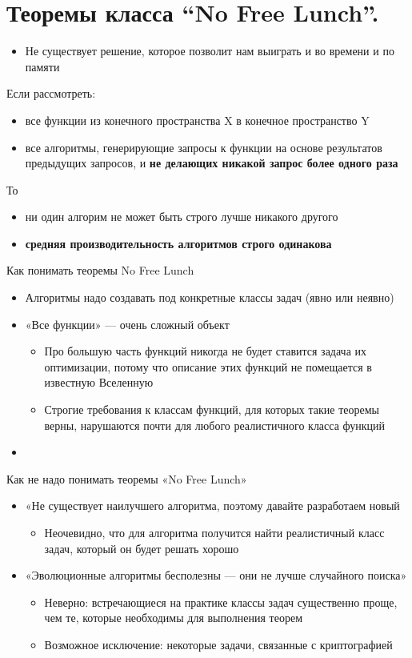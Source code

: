 \section{Теоремы класса “No Free Lunch”.}
\begin{itemize}
    \item Не существует решение, которое позволит нам выиграть и во времени и по памяти
\end{itemize}
Если рассмотреть:
\begin{itemize}
    \item все функции из конечного пространства X в конечное пространство Y
    \item все алгоритмы, генерирующие запросы к функции на основе результатов предыдущих запросов, и \textbf{не делающих никакой запрос более одного раза}
\end{itemize}

То
\begin{itemize}
    \item ни один алгорим не может быть строго лучше никакого другого
    \item \textbf{средняя производительность алгоритмов строго одинакова}
\end{itemize}

Как понимать теоремы No Free Lunch
\begin{itemize}
    \item Алгоритмы надо создавать под конкретные классы задач (явно или неявно) 
    \item «Все функции» — очень сложный объект
    \begin{itemize}
        \item Про большую часть функций никогда не будет ставится задача их оптимизации, потому что описание этих функций не помещается в известную Вселенную
        \item Строгие требования к классам функций, для которых такие теоремы верны, нарушаются почти для любого реалистичного класса функций
    \end{itemize}
    \item 
\end{itemize}


Как не надо понимать теоремы «No Free Lunch»
\begin{itemize}
    \item «Не существует наилучшего алгоритма, поэтому давайте разработаем новый
    \begin{itemize}
        \item Неочевидно, что для алгоритма получится найти реалистичный класс задач, который он будет решать хорошо
    \end{itemize}
    \item «Эволюционные алгоритмы бесполезны — они не лучше случайного поиска»
    \begin{itemize}
        \item Неверно: встречающиеся на практике классы задач существенно проще, чем те, которые необходимы для выполнения теорем
        \item Возможное исключение: некоторые задачи, связанные с криптографией    
    \end{itemize}
\end{itemize}
